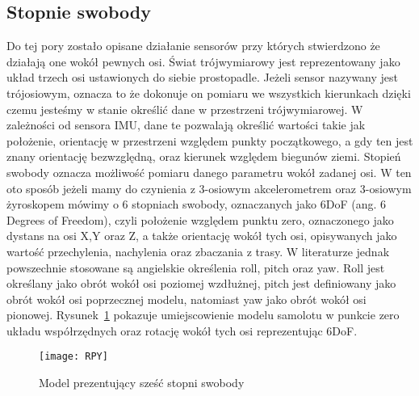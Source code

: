 		\subsection{Stopnie swobody}
		\label{subsec:swobody}	
		Do tej pory zostało opisane działanie sensorów przy których stwierdzono że działają one wokół pewnych osi. Świat trójwymiarowy jest reprezentowany jako układ trzech osi ustawionych do siebie prostopadle. Jeżeli sensor nazywany jest trójosiowym, oznacza to że dokonuje on pomiaru we wszystkich kierunkach dzięki czemu jesteśmy w stanie określić dane w przestrzeni trójwymiarowej. W zależności od sensora IMU, dane te pozwalają określić wartości takie jak położenie, orientację w przestrzeni względem punkty początkowego, a gdy ten jest znany orientację bezwzględną, oraz kierunek względem biegunów ziemi. Stopień swobody oznacza możliwość pomiaru danego parametru wokół zadanej osi. W ten oto sposób jeżeli mamy do czynienia z 3-osiowym akcelerometrem oraz 3-osiowym żyroskopem mówimy o 6 stopniach swobody, oznaczanych jako 6DoF (ang. 6 Degrees of Freedom), czyli położenie względem punktu zero, oznaczonego jako dystans na osi X,Y oraz Z, a także orientację wokół tych osi, opisywanych jako wartość przechylenia, nachylenia oraz zbaczania z trasy. W literaturze jednak powszechnie stosowane są angielskie określenia roll, pitch oraz yaw. Roll jest określany jako obrót wokół osi poziomej wzdłużnej, pitch jest definiowany jako obrót wokół osi poprzecznej modelu, natomiast yaw jako obrót wokół osi pionowej. Rysunek~\ref{fig:rpy} pokazuje umiejscowienie modelu samolotu w punkcie zero układu współrzędnych oraz rotację wokół tych osi reprezentując 6DoF. 
\begin{figure}[h]
\centering
\texttt{[image: RPY]}
\caption{Model prezentujący sześć stopni swobody~\cite{sam1}}
\label{fig:rpy}
\end{figure}	

